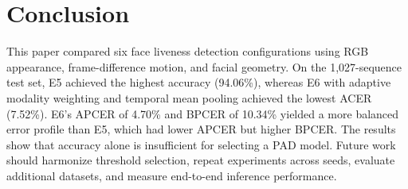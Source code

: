 \documentclass[a4paper,conference]{IEEEtran}
\begin{document}
\section{Conclusion}
This paper compared six face liveness detection configurations using RGB appearance, frame-difference motion, and facial geometry. On the 1,027-sequence test set, E5 achieved the highest accuracy (94.06\%), whereas E6 with adaptive modality weighting and temporal mean pooling achieved the lowest ACER (7.52\%). E6's APCER of 4.70\% and BPCER of 10.34\% yielded a more balanced error profile than E5, which had lower APCER but higher BPCER. The results show that accuracy alone is insufficient for selecting a PAD model. Future work should harmonize threshold selection, repeat experiments across seeds, evaluate additional datasets, and measure end-to-end inference performance.
\end{document}
